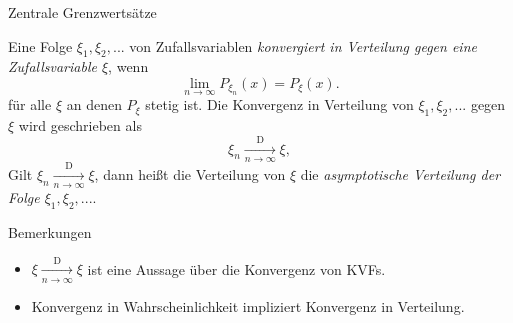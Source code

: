 \documentclass[
  8pt,
  ignorenonframetext,
]{beamer}
\providecommand{\tightlist}{%
  \setlength{\itemsep}{0pt}\setlength{\parskip}{0pt}}
\begin{document}
\begin{frame}{Zentrale Grenzwertsätze}
\protect\hypertarget{zentrale-grenzwertsuxe4tze-1}{}
\footnotesize
\begin{definition}
\justifying
Eine Folge $\xi_1,\xi_2,...$ von Zufallsvariablen \textit{konvergiert in Verteilung 
gegen eine Zufallsvariable $\xi$}, wenn
\begin{equation}
\lim_{n \to \infty} P_{\xi_n}(x) = P_\xi(x).
\end{equation}
für alle $\xi$ an denen $P_\xi$ stetig ist.
Die Konvergenz in Verteilung von $\xi_1,\xi_2,...$ gegen $\xi$ wird geschrieben als
\begin{equation}
\xi_n\xrightarrow[n\to \infty]{\text{D}} \xi,
\end{equation}
Gilt $\xi_n\xrightarrow[n\to \infty]{\text{D}} \xi$, dann heißt die Verteilung von 
$\xi$ die \textit{asymptotische Verteilung der Folge $\xi_1,\xi_2,...$}.
\end{definition}
\footnotesize

Bemerkungen

\begin{itemize}
\tightlist
\item
  \(\xi\xrightarrow[n\to \infty]{\text{D}} \xi\) ist eine Aussage über
  die Konvergenz von KVFs.
\item
  Konvergenz in Wahrscheinlichkeit impliziert Konvergenz in Verteilung.
\end{itemize}
\end{frame}
\end{document}
